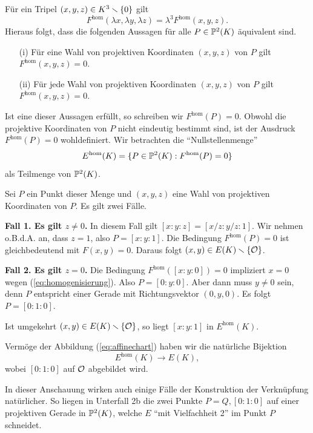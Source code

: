 Für ein Tripel $(x,y,z)\in K^3\smallsetminus\{0\}$ gilt
$$F^{\mathrm{hom}}(\lambda x,\lambda y,\lambda z)
=\lambda^3F^{\mathrm{hom}}(x,y,z).$$
Hieraus folgt, dass die folgenden Aussagen für alle $P\in {\mathbb{P}}^2(K)$
äquivalent  sind.
\begin{enumerate}
\item [(i)] Für eine Wahl von projektiven Koordinaten $(x,y,z)$ von
  $P$ gilt $  F^{\mathrm{hom}}(x,y,z) = 0$.
\item [(ii)] Für jede Wahl von projektiven Koordinaten $(x,y,z)$ von
  $P$ gilt $  F^{\mathrm{hom}}(x,y,z) = 0$.
\end{enumerate}
Ist eine dieser Aussagen erfüllt, so schreiben wir
$F^{\mathrm{hom}}(P)=0$. Obwohl die projektive Koordinaten von $P$
nicht eindeutig bestimmt sind, ist der Ausdruck
$F^{\mathrm{hom}}(P)=0$
wohldefiniert. 
Wir betrachten die ``Nullstellenmenge''
\begin{equation*}
  E^{\mathrm{hom}}(K) = \{P \in {\mathbb{P}}^2(K): F^{\mathrm{hom}}(P) = 0\}
\end{equation*}
als Teilmenge von ${\mathbb{P}}^2(K)$.

Sei $P$ ein Punkt dieser Menge und $(x,y,z)$ eine Wahl von projektiven
Koordinaten von $P$. Es gilt zwei Fälle.

\textbf{Fall 1. Es gilt $z\not=0$.} In diesem Fall gilt $[x:y:z] =
[x/z:y/z:1]$. Wir nehmen o.B.d.A. an, dass $z=1$, also $P=[x:y:1]$.
Die Bedingung $F^{\mathrm{hom}}(P)=0$ ist gleichbedeutend mit
$F(x,y)=0$. Daraus folgt
 $(x,y) \in E(K)\smallsetminus\{{\mathcal O}\}$.

\textbf{Fall 2. Es gilt $z=0$.} Die Bedingung
$F^{\mathrm{hom}}([x:y:0])=0$ impliziert
$x=0$ wegen (\ref{eq:homogenisierung}). Also $P = [0:y:0]$. Aber dann
muss $y\not=0$ sein, denn $P$ entspricht einer Gerade mit
Richtungsvektor $(0,y,0)$. Es folgt $P = [0:1:0]$.

Ist umgekehrt $(x,y)\in E(K)\smallsetminus\{{\mathcal O}\}$, so liegt $[x:y:1]$ in
$E^{\mathrm{hom}}(K)$.


Vermöge der Abbildung (\ref{eq:affinechart}) haben wir die natürliche
Bijektion 
\begin{equation*}
  E^{\mathrm{hom}}(K) \rightarrow E(K),
\end{equation*}
wobei $[0:1:0]$ auf ${\mathcal O}$ abgebildet wird. 

In dieser Anschauung wirken auch einige Fälle der Konstruktion der
Verknüpfung natürlicher. So liegen in  Unterfall 2b die zwei Punkte
$P=Q,[0:1:0]$ auf einer projektiven Gerade in ${\mathbb{P}}^2(K)$, welche $E$
``mit Vielfachheit 2'' im Punkt $P$ schneidet. 

